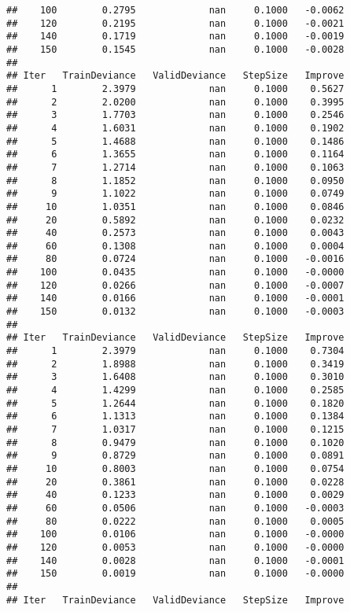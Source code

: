 \documentclass[]{article}
\begin{document}
\begin{verbatim}
##    100        0.2795             nan     0.1000   -0.0062
##    120        0.2195             nan     0.1000   -0.0021
##    140        0.1719             nan     0.1000   -0.0019
##    150        0.1545             nan     0.1000   -0.0028
## 
## Iter   TrainDeviance   ValidDeviance   StepSize   Improve
##      1        2.3979             nan     0.1000    0.5627
##      2        2.0200             nan     0.1000    0.3995
##      3        1.7703             nan     0.1000    0.2546
##      4        1.6031             nan     0.1000    0.1902
##      5        1.4688             nan     0.1000    0.1486
##      6        1.3655             nan     0.1000    0.1164
##      7        1.2714             nan     0.1000    0.1063
##      8        1.1852             nan     0.1000    0.0950
##      9        1.1022             nan     0.1000    0.0749
##     10        1.0351             nan     0.1000    0.0846
##     20        0.5892             nan     0.1000    0.0232
##     40        0.2573             nan     0.1000    0.0043
##     60        0.1308             nan     0.1000    0.0004
##     80        0.0724             nan     0.1000   -0.0016
##    100        0.0435             nan     0.1000   -0.0000
##    120        0.0266             nan     0.1000   -0.0007
##    140        0.0166             nan     0.1000   -0.0001
##    150        0.0132             nan     0.1000   -0.0003
## 
## Iter   TrainDeviance   ValidDeviance   StepSize   Improve
##      1        2.3979             nan     0.1000    0.7304
##      2        1.8988             nan     0.1000    0.3419
##      3        1.6408             nan     0.1000    0.3010
##      4        1.4299             nan     0.1000    0.2585
##      5        1.2644             nan     0.1000    0.1820
##      6        1.1313             nan     0.1000    0.1384
##      7        1.0317             nan     0.1000    0.1215
##      8        0.9479             nan     0.1000    0.1020
##      9        0.8729             nan     0.1000    0.0891
##     10        0.8003             nan     0.1000    0.0754
##     20        0.3861             nan     0.1000    0.0228
##     40        0.1233             nan     0.1000    0.0029
##     60        0.0506             nan     0.1000   -0.0003
##     80        0.0222             nan     0.1000    0.0005
##    100        0.0106             nan     0.1000   -0.0000
##    120        0.0053             nan     0.1000   -0.0000
##    140        0.0028             nan     0.1000   -0.0001
##    150        0.0019             nan     0.1000   -0.0000
## 
## Iter   TrainDeviance   ValidDeviance   StepSize   Improve

\end{verbatim}
\end{document}
